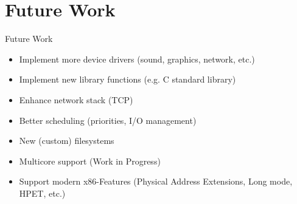 \section{Future Work}

\begin{frame}{Future Work}
	\begin{itemize}
		\setlength\itemsep{1em}
		\item Implement more device drivers (sound, graphics, network, etc.)
		\item Implement new library functions (e.g. C standard library)
		\item Enhance network stack (TCP)
		\item Better scheduling (priorities, I/O management)
		\item New (custom) filesystems
		\item Multicore support (Work in Progress)
		\item Support modern x86-Features (Physical Address Extensions, Long mode, HPET, etc.)
	\end{itemize}	
\end{frame}